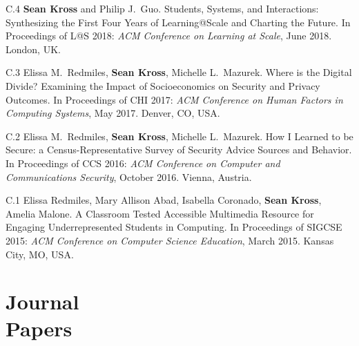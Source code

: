 \begin{bibenum}
\item[C.4] \textbf{Sean Kross} and Philip J.\ Guo. Students, Systems,
and Interactions: Synthesizing the First Four Years of Learning@Scale
and Charting the Future. In Proceedings of L@S 2018: \emph{ACM
Conference on Learning at Scale}, June 2018. London, UK.

\item[C.3] Elissa M.\ Redmiles, \textbf{Sean Kross}, Michelle L.\ Mazurek. 
Where is the Digital Divide? Examining the Impact of Socioeconomics on Security 
and Privacy Outcomes. In Proceedings of CHI 2017: \emph{ACM Conference on 
Human Factors in Computing Systems}, May 2017. Denver, CO, USA.

\item[C.2] Elissa M.\ Redmiles, \textbf{Sean Kross}, Michelle L.\ Mazurek. How 
I Learned to be Secure: a Census-Representative Survey of Security Advice 
Sources and Behavior. In Proceedings of CCS 2016: \emph{ACM Conference on 
Computer and Communications Security}, October 2016. Vienna, Austria.

\item[C.1] Elissa Redmiles, Mary Allison Abad, Isabella Coronado, 
\textbf{Sean Kross}, Amelia Malone. A Classroom Tested Accessible Multimedia 
Resource for Engaging Underrepresented Students in Computing. In Proceedings of
SIGCSE 2015: \emph{ACM Conference on Computer Science Education}, March 2015. 
Kansas City, MO, USA.

\end{bibenum}

\vspace{0.1in}





\section{Journal \\ Papers}

